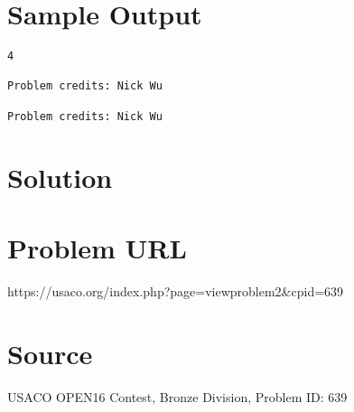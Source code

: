 \documentclass[12pt]{article}
\begin{document}
\section*{Sample Output}
\begin{verbatim}
4

Problem credits: Nick Wu

Problem credits: Nick Wu
\end{verbatim}

\section*{Solution}


\section*{Problem URL}
https://usaco.org/index.php?page=viewproblem2&cpid=639

\section*{Source}
USACO OPEN16 Contest, Bronze Division, Problem ID: 639
\end{document}
